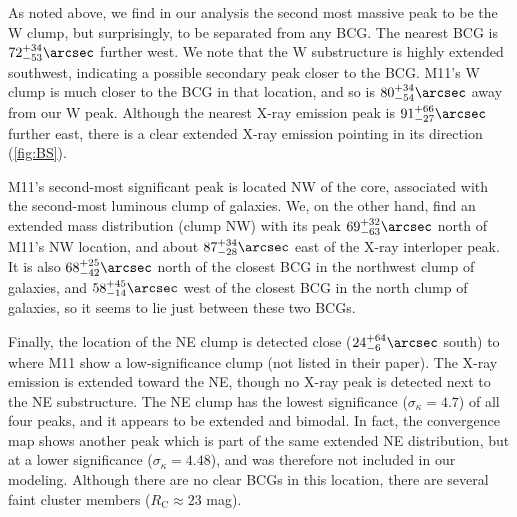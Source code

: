 \documentclass[iop,twocolumn]{emulateapj}
\def\RC{\mbox{$R_\mathrm{C}$}}
\begin{document}
As noted above, we find in our analysis the second most massive peak to be the W clump, but surprisingly, to be separated from any BCG. The nearest BCG is  $72^{+34}_{-53}\arcsec$ further west. We note that the W substructure is highly extended southwest, indicating a possible secondary peak closer to the BCG. M11's W clump is much closer to the BCG in that location, and so is $80^{+34}_{-54}\arcsec$ away from our W peak. Although the nearest X-ray emission peak is $91^{+66}_{-27}\arcsec$ further east, there is a clear extended X-ray emission pointing in its direction (\autoref{fig:BS}). 

M11's second-most significant peak is located NW of the core, associated with the second-most luminous clump of galaxies. We, on the other hand, find an extended mass distribution (clump NW) with its peak  $69^{+32}_{-63}\arcsec$ north of M11's NW location, and about $87^{+34}_{-28}\arcsec$ east of the X-ray interloper peak. 
It is also  $68^{+25}_{-42}\arcsec$ north of the closest BCG in the northwest clump of galaxies, and $58^{+45}_{-14}\arcsec$ west of the closest BCG in the north clump of galaxies, so it seems to lie just between these two BCGs.


Finally, the location of the NE clump is detected close ($24^{+64}_{-6}\arcsec$ south) to where M11 show a low-significance clump (not listed in their paper). The X-ray emission is extended toward the NE, though no X-ray peak is detected next to the NE substructure. The NE clump has the lowest significance ($\sigma_\kappa=4.7$) of all four peaks, and it appears to be extended and bimodal. In fact, the convergence map shows another peak which is part of the same extended NE distribution, but at a lower significance ($\sigma_\kappa=4.48$), and was therefore not included in our modeling. Although there are no clear BCGs in this location, there are several faint cluster members ($\RC\approx23$ mag).
\end{document}
